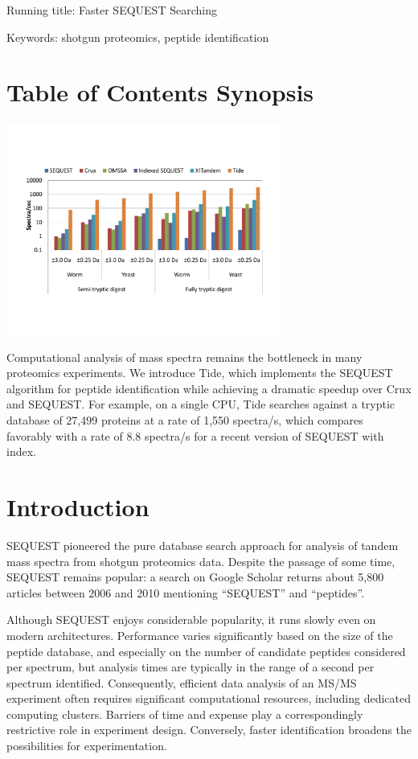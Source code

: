 \noindent Running title: {\sc Faster SEQUEST Searching}

\noindent Keywords: shotgun proteomics, peptide identification

\clearpage
\section*{Table of Contents Synopsis}

\centerline{\includegraphics[width=9.0cm]{timing_chart_tocs-cropped.pdf}}

Computational analysis of mass spectra remains the bottleneck in many
proteomics experiments. We introduce Tide, which implements the
SEQUEST algorithm for peptide identification while achieving a
dramatic speedup over Crux and SEQUEST.  For example, on a single CPU,
Tide searches against a tryptic database of 27,499 proteins at a rate
of 1,550 spectra/s, which compares favorably with a rate of 8.8
spectra/s for a recent version of SEQUEST with index.

\clearpage

\section{Introduction}

SEQUEST \cite{eng:approach} pioneered the pure database search
approach for analysis of tandem mass spectra from shotgun proteomics
data. Despite the passage of some time, SEQUEST remains popular: a
search on Google Scholar returns about 5,800 articles between 2006
and 2010 mentioning ``SEQUEST'' and ``peptides''.

Although SEQUEST enjoys considerable popularity, it runs slowly even
on modern architectures. Performance varies significantly based on the
size of the peptide database, and especially on the number of
candidate peptides considered per spectrum, but analysis times are
typically in the range of a second per spectrum identified.  Consequently,
efficient data
analysis of an MS/MS experiment often requires significant
computational resources, including dedicated computing
clusters. Barriers of time and expense play a correspondingly
restrictive role in experiment design. Conversely, faster
identification broadens the possibilities for experimentation.


